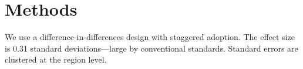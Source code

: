 \section{Methods}
We use a difference-in-differences design with staggered adoption.
The effect size is 0.31 standard deviations---large by conventional standards.
Standard errors are clustered at the region level.
